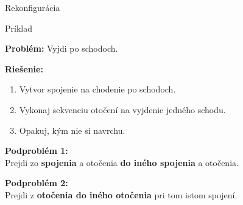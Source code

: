 \documentclass{beamer}
\begin{document}
\begin{frame}{Rekonfigurácia}
\begin{center}
\end{center}
\end{frame}

\begin{frame}{Príklad}

  \textbf{Problém:} Vyjdi po schodoch. 
  
  \pause
  
  \textbf{Riešenie: }
  \begin{enumerate}
    \item Vytvor spojenie na chodenie po schodoch.
    \item Vykonaj sekvenciu otočení na vyjdenie jedného schodu.
    \item Opakuj, kým nie si navrchu.
  \end{enumerate}
  
  \pause
  
  \textbf{Podproblém 1:}\\
  Prejdi zo \textbf{spojenia} a otočenia \textbf{do iného spojenia} a otočenia.
  
  \pause  
  
  \textbf{Podproblém 2:}\\  
  Prejdi z \textbf{otočenia do iného otočenia} pri tom istom spojení.
\end{frame}
\end{document}
